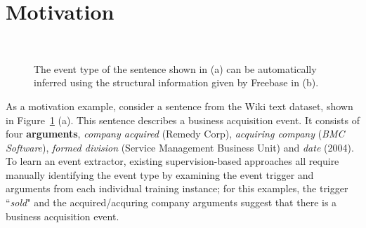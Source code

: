 \section{Motivation}
\begin{figure}
  \centering
   \\
  \caption{The event type of the sentence shown in (a) can be automatically inferred using the structural information given by Freebase in (b).}
  \label{fig:example}
\end{figure}


As a motivation example, consider a sentence from the Wiki text dataset, shown in Figure~\ref{fig:example} (a). This sentence describes a
business acquisition event. It consists of four \textbf{arguments}, \emph{company acquired} (Remedy Corp), \emph{acquiring company}
(\emph{BMC Software}), \emph{formed division} (Service Management Business Unit) and \emph{date} (2004). To learn an event extractor,
existing supervision-based approaches all require manually identifying the event type by examining the event trigger and arguments from
each individual training instance; for this examples, the trigger ``\emph{sold}" and the acquired/acquring company arguments suggest that
there is a business acquisition event.

